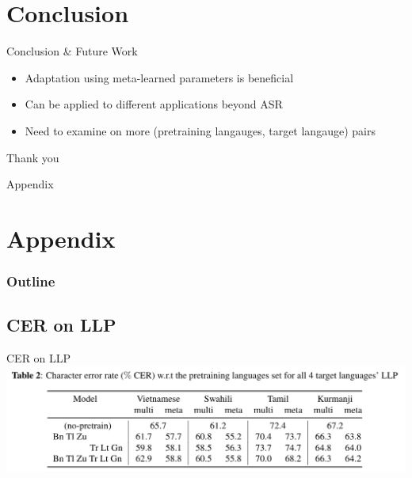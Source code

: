 \documentclass{beamer}
\begin{document}
\section{Conclusion}
\begin{frame}[t]{Conclusion \& Future Work}
  \begin{itemize}
    \item Adaptation using meta-learned parameters is beneficial
    \item Can be applied to different applications beyond ASR
    \item Need to examine on more (pretraining langauges, target langauge) pairs
  \end{itemize}
\end{frame}

\begin{frame}
	\begin{center}
    \LARGE{Thank you}
	\end{center}
\end{frame}




\begin{frame}
	\begin{center}
    \LARGE{Appendix}
	\end{center}
\end{frame}

\section{Appendix}
\begin{frame}
\frametitle{Outline}
\tableofcontents
\end{frame}

\subsection{CER on LLP}
\begin{frame}[t]{CER on LLP}
  \center \includegraphics[width=1.0\textwidth]{fig/llp_table.png}
\end{frame}
\end{document}
